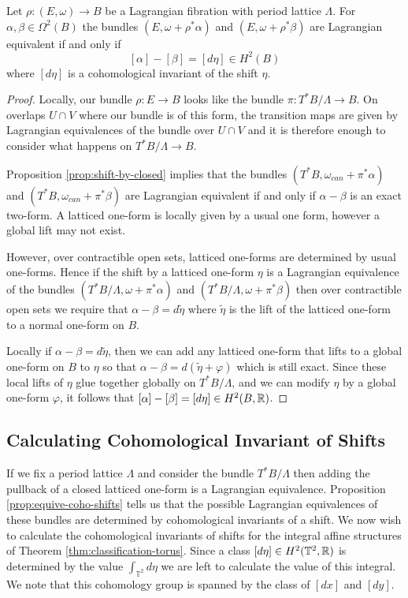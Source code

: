 \begin{prop}\label{prop:equive-coho-shifts}
    Let $\rho: (E, \omega) \to B$ be a Lagrangian fibration with period lattice $\Lambda$. For $\alpha, \beta \in \Omega^2(B)$
    the bundles $(E, \omega + \rho^* \alpha)$ and $(E, \omega + \rho^* \beta)$ are Lagrangian equivalent if and only if
    $$[\alpha] - [\beta] = [d\eta] \in H^2(B)$$ where $[d\eta]$ is a cohomological invariant of the shift $\eta$.
\end{prop}
\begin{proof}
    Locally, our bundle $\rho: E \to B$ looks like the bundle $\pi:T^*B/ \Lambda \to B$. On overlaps $U \cap V$ where our bundle is of this form, the transition maps
    are given by Lagrangian equivalences of the bundle over $U \cap V$ and it is therefore enough to consider what happens on $T^*B/\Lambda \to B$.

    Proposition \ref{prop:shift-by-closed} implies that the bundles $(T^*B,
        \omega_{can} + \pi^* \alpha)$ and $(T^*B, \omega_{can} + \pi^* \beta)$ are
    Lagrangian equivalent if and only if $\alpha - \beta$ is an exact two-form. A
    latticed one-form is locally given by a usual one form, however a global lift
    may not exist.

    However, over contractible open sets, latticed one-forms are determined by
    usual one-forms. Hence if the shift by a latticed one-form $\eta$ is a
    Lagrangian equivalence of the bundles $(T^*B/\Lambda, \omega + \pi^* \alpha)$
    and $(T^*B/\Lambda, \omega + \pi^* \beta)$ then over contractible open sets we
    require that $\alpha - \beta = d \tilde{\eta}$ where $\tilde{\eta}$ is the lift
    of the latticed one-form to a normal one-form on $B$.

    Locally if $\alpha - \beta = d \tilde{\eta}$, then we can add any latticed
    one-form that lifts to a global one-form on $B$ to $\eta$ so that $\alpha -
        \beta = d (\tilde{\eta} + \varphi)$ which is still exact. Since these local
    lifts of $\eta$ glue together globally on $T^*B/\Lambda$, and we can modify
    $\eta$ by a global one-form $\varphi$, it follows that $[\alpha] - [\beta] =
        [d\eta] \in H^2(B, \mathbb{R})$.
\end{proof}

\subsection{Calculating Cohomological Invariant of Shifts}
If we fix a period lattice $\Lambda$ and consider the bundle $T^*B/\Lambda$
then adding the pullback of a closed latticed one-form is a Lagrangian
equivalence. Proposition \ref{prop:equive-coho-shifts} tells us that the
possible Lagrangian equivalences of these bundles are determined by
cohomological invariants of a shift. We now wish to calculate the cohomological
invariants of shifts for the integral affine structures of Theorem
\ref{thm:classification-torus}. Since a class $[d\eta] \in H^2(\mathbb{T}^2,
    \mathbb{R})$ is determined by the value $\int_{\mathbb{T}^2}d\eta$ we are left to
calculate the value of this integral. We note that this cohomology group is
spanned by the class of $[dx]$ and $[dy]$.

